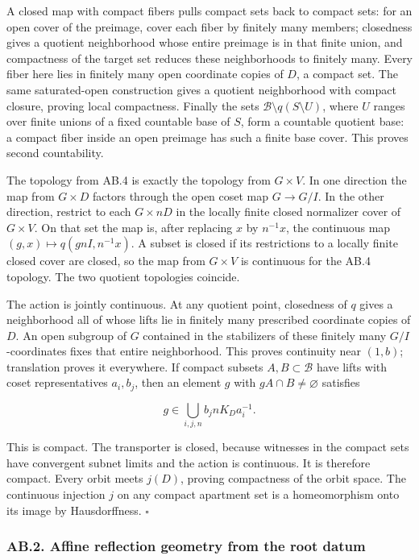 \documentclass[
  11pt,
]{article}
\begin{document}
A closed map with compact fibers pulls compact sets back to compact
sets: for an open cover of the preimage, cover each fiber by finitely
many members; closedness gives a quotient neighborhood whose entire
preimage is in that finite union, and compactness of the target set
reduces these neighborhoods to finitely many. Every fiber here lies in
finitely many open coordinate copies of \(D\), a compact set. The same
saturated-open construction gives a quotient neighborhood with compact
closure, proving local compactness. Finally the sets
\(\mathcal B\setminus q(S\setminus U)\), where \(U\) ranges over finite
unions of a fixed countable base of \(S\), form a countable quotient
base: a compact fiber inside an open preimage has such a finite base
cover. This proves second countability.

The topology from AB.4 is exactly the topology from \(G\times V\). In
one direction the map from \(G\times D\) factors through the open coset
map \(G\to G/I\). In the other direction, restrict to each
\(G\times nD\) in the locally finite closed normalizer cover of
\(G\times V\). On that set the map is, after replacing \(x\) by
\(n^{-1}x\), the continuous map \((g,x)\mapsto q(gnI,n^{-1}x)\). A
subset is closed if its restrictions to a locally finite closed cover
are closed, so the map from \(G\times V\) is continuous for the AB.4
topology. The two quotient topologies coincide.

The action is jointly continuous. At any quotient point, closedness of
\(q\) gives a neighborhood all of whose lifts lie in finitely many
prescribed coordinate copies of \(D\). An open subgroup of \(G\)
contained in the stabilizers of these finitely many \(G/I\)-coordinates
fixes that entire neighborhood. This proves continuity near \((1,b)\);
translation proves it everywhere. If compact subsets
\(A,B\subset\mathcal B\) have lifts with coset representatives
\(a_i,b_j\), then an element \(g\) with \(gA\cap B\ne\varnothing\)
satisfies

\[
 g\in\bigcup_{i,j,n} b_j n K_D a_i^{-1}.
\]

This is compact. The transporter is closed, because witnesses in the
compact sets have convergent subnet limits and the action is continuous.
It is therefore compact. Every orbit meets \(j(D)\), proving compactness
of the orbit space. The continuous injection \(j\) on any compact
apartment set is a homeomorphism onto its image by Hausdorffness.
\(\square\)

\subsubsection{AB.2. Affine reflection geometry from the root
datum}\label{ab.2.-affine-reflection-geometry-from-the-root-datum}
\end{document}
